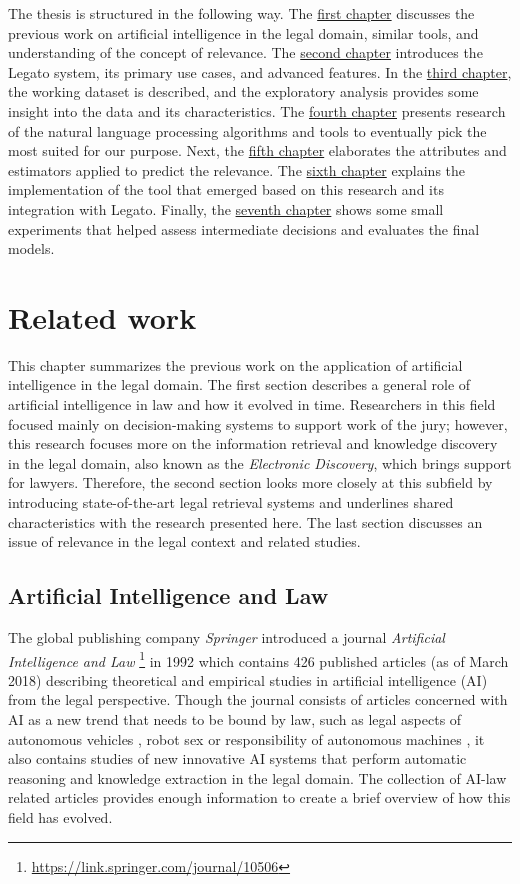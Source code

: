 \documentclass[
  digital, %
  notable,   %
  nolof,     %
  nolot,     %
]{fithesis3}
\begin{document}
The thesis is structured in the following way.
The \hyperref[chp:related_work]{first chapter} discusses the previous work on artificial intelligence in the legal domain, similar tools, and understanding of the concept of relevance.
The \hyperref[chp:legato]{second chapter} introduces the Legato system, its primary use cases, and advanced features.
In the \hyperref[chp:data_characteristics]{third chapter}, the working dataset is described, and the exploratory analysis provides some insight into the data and its characteristics.
The \hyperref[chp:nlp]{fourth chapter} presents research of the natural language processing algorithms and tools to eventually pick the most suited for our purpose.
Next, the \hyperref[chp:classification]{fifth chapter} elaborates the attributes and estimators applied to predict the relevance.
The \hyperref[chp:implementation]{sixth chapter} explains the implementation of the tool that emerged based on this research and its integration with Legato.
Finally, the \hyperref[chp:evaluation]{seventh chapter} shows some small experiments that helped assess intermediate decisions and evaluates the final models.

\chapter{Related work}
\label{chp:related_work}
This chapter summarizes the previous work on the application of artificial intelligence in the legal domain. 
The first section describes a general role of artificial intelligence in law and how it evolved in time.
Researchers in this field focused mainly on decision-making systems to support work of the jury; however, this research focuses more on the information retrieval and knowledge discovery in the legal domain, also known as the \textit{Electronic Discovery}, which brings support for lawyers.
Therefore, the second section looks more closely at this subfield by introducing state-of-the-art legal retrieval systems and underlines shared characteristics with the research presented here.
The last section discusses an issue of relevance in the legal context and related studies.

\section{Artificial Intelligence and Law}
The global publishing company \textit{Springer} introduced a journal \textit{Artificial Intelligence and Law} \footnote{\url{https://link.springer.com/journal/10506}} in 1992 which contains 426 published articles (as of March 2018) describing theoretical and empirical studies in artificial intelligence (AI) from the legal perspective.
Though the journal consists of articles concerned with AI as a new trend that needs to be bound by law, such as legal aspects of autonomous vehicles \cite{Prakken2017autonomous}, robot sex \cite{Frank2017robotSex} or responsibility of autonomous machines \cite{Brozek2017AIresponsibility}, it also contains studies of new innovative AI systems that perform automatic reasoning and knowledge extraction in the legal domain.
The collection of AI-law related articles provides enough information to create a brief overview of how this field has evolved.
\end{document}
